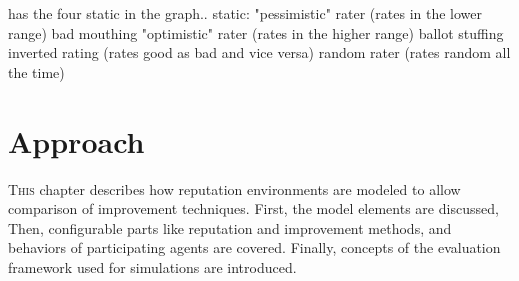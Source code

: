 \documentclass[%
    ]{\PathToTumTemplate/thesis/tum_thesis}
\begin{document}
\cite{yu_detecting_2003} has the four static in the graph..
static:
"pessimistic" rater (rates in the lower range) bad mouthing
"optimistic" rater (rates in the higher range) ballot stuffing
inverted rating (rates good as bad and vice versa)
random rater (rates random all the time)



\chapter{Approach}\label{chap:approach}






\lettrine{T}{his} chapter describes how reputation environments are modeled to allow comparison of improvement techniques.
First, the model elements are discussed,
Then, configurable parts like reputation and improvement methods, and behaviors of participating agents are covered.
Finally, concepts of the evaluation framework used for simulations are introduced.
\end{document}
